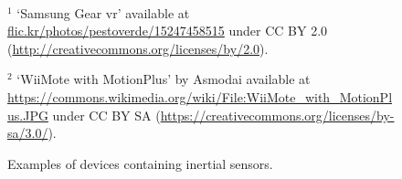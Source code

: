 \begin{figure}
  \centering
     \\
   \hspace{3mm}
  \caption{Examples of devices containing inertial sensors.}
  \vspace{2cm} 
  \footnoterule
  \vspace{-0.3cm}
  \flushleft \setlength{\rightskip}{0pt} 
  \footnotesize{\hspace{1em} $^1$ `Samsung Gear \gls{vr}'  available at \url{flic.kr/photos/pestoverde/15247458515} under CC BY 2.0 (\url{http://creativecommons.org/licenses/by/2.0}).}
  
  \footnotesize{\hspace{1em} $^2$ `WiiMote with MotionPlus' \hspace{0.3pt} by \hspace{0.3pt} Asmodai \hspace{0.3pt} available \hspace{0.3pt} at \hspace{0.3pt} \url{https://commons.wikimedia.org/wiki/File:WiiMote_with_MotionPlus.JPG} under CC BY SA (\url{https://creativecommons.org/licenses/by-sa/3.0/}).}
  \label{fig:intro-inertialSensors}
\end{figure}

